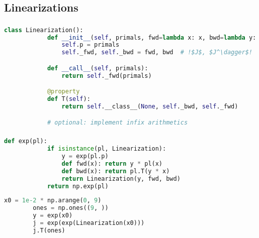\documentclass[aspectratio=169,xcolor=dvipsnames]{beamer}
\begin{document}
\subsection{Linearizations}
\begin{frame}[fragile]
	\frametitle{\insertsection}
	\framesubtitle{\insertsubsection}

	\begin{lstlisting}[language=python,escapechar=!]
		class Linearization():
			def __init__(self, primals, fwd=lambda x: x, bwd=lambda y: y):
				self.p = primals
				self._fwd, self._bwd = fwd, bwd  # !$J$, $J^\dagger$!

			def __call__(self, primals):
				return self._fwd(primals)

			@property
			def T(self):
				return self.__class__(None, self._bwd, self._fwd)

			# optional: implement infix arithmetics
	\end{lstlisting}

\end{frame}

\begin{frame}[fragile]
	\frametitle{\insertsection}
	\framesubtitle{\insertsubsection}

	\begin{lstlisting}[language=python,escapechar=!]
		def exp(pl):
			if isinstance(pl, Linearization):
				y = exp(pl.p)
				def fwd(x): return y * pl(x)
				def bwd(x): return pl.T(y * x)
				return Linearization(y, fwd, bwd)
			return np.exp(pl)
	\end{lstlisting}

	\pause
	\begin{lstlisting}[language=python,escapechar=!]
		x0 = 1e-2 * np.arange(0, 9)
		ones = np.ones((9, ))
		y = exp(x0)
		j = exp(exp(Linearization(x0)))
		j.T(ones)
	\end{lstlisting}

\end{frame}
\end{document}
